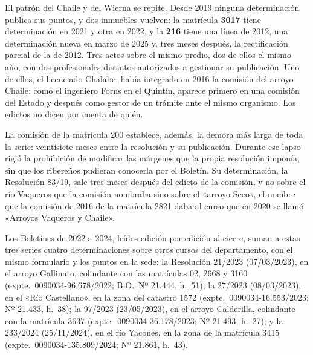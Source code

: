 \begin{cautela}
El patrón del Chaile y del Wierna se repite. Desde 2019 ninguna determinación publica sus puntos, y dos inmuebles vuelven: la matrícula \textbf{3017} tiene determinación en 2021 y otra en 2022, y la \textbf{216} tiene una línea de 2012, una determinación nueva en marzo de 2025 y, tres meses después, la rectificación parcial de la de 2012. Tres actos sobre el mismo predio, dos de ellos el mismo año, con dos profesionales distintos autorizados a gestionar su publicación. Uno de ellos, el licenciado Chalabe, había integrado en 2016 la comisión del arroyo Chaile: como el ingeniero Forns en el Quintín, aparece primero en una comisión del Estado y después como gestor de un trámite ante el mismo organismo. Los edictos no dicen por cuenta de quién.

La comisión de la matrícula 200 establece, además, la demora más larga de toda la serie: veintisiete meses entre la resolución y su publicación. Durante ese lapso rigió la prohibición de modificar las márgenes que la propia resolución imponía, sin que los ribereños pudieran conocerla por el Boletín. Su determinación, la Resolución 83/19, sale tres meses después del edicto de la comisión, y no sobre el río Vaqueros que la comisión nombraba sino sobre el «arroyo Seco», el nombre que la comisión de 2016 de la matrícula 2821 daba al curso que en 2020 se llamó «Arroyos Vaqueros y Chaile». 
\end{cautela}

Los Boletines de 2022 a 2024, leídos edición por edición al cierre, suman a estas tres series cuatro determinaciones sobre otros cursos del departamento, con el mismo formulario y los puntos en la sede: la Resolución 21/2023 (07/03/2023), en el arroyo Gallinato, colindante con las matrículas 02, 2668 y 3160 (expte.\ 0090034-96.678/2022; B.O.\ Nº 21.444, h.\ 51); la 27/2023 (08/03/2023), en el «Río Castellano», en la zona del catastro 1572 (expte.\ 0090034-16.553/2023; Nº 21.433, h.\ 38); la 97/2023 (23/05/2023), en el arroyo Calderilla, colindante con la matrícula 3637 (expte.\ 0090034-36.178/2023; Nº 21.493, h.\ 27); y la 233/2024 (25/11/2024), en el río Yacones, en la zona de la matrícula 3415 (expte.\ 0090034-135.809/2024; Nº 21.861, h.\ 43). 

